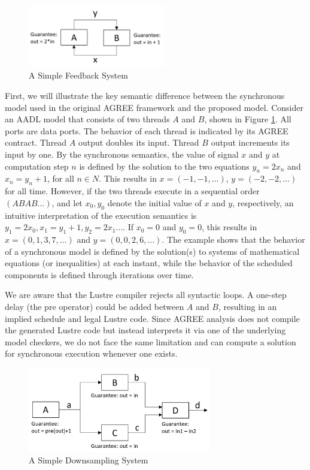 \begin{figure}[ht!]
\centering
\includegraphics[width=60mm]{simpleFeedback.jpg}
\caption{A Simple Feedback System\label{motivationFig1}}
\end{figure}

First, we will illustrate the key semantic difference between the synchronous model used in the original AGREE framework and the proposed model.
Consider an AADL model that consists of two threads $A$ and $B$, shown in Figure \ref{motivationFig1}. All ports are data ports. The behavior of each thread is indicated by its AGREE contract. Thread $A$ output doubles its input. Thread $B$ output increments its input by one. By the synchronous semantics, the value of signal $x$ and $y$ at computation step $n$ is defined by the solution to the two equations $y_n = 2x_n$ and $x_n = y_n+1$, for all $n \in N$. This results in $x = (-1, -1, …)$, $y = (-2, -2, …)$ for all time. However, if the two threads execute in a sequential order $(ABAB...)$, and let $x_0, y_0$ denote the initial value of $x$ and $y$, respectively, an intuitive interpretation of the execution semantics is $y_1 = 2x_0, x_1 = y_1+1, y_2 = 2x_1...$. If $x_0 = 0$ and  $y_0 = 0$, this results in $x = (0, 1, 3, 7,…)$ and $y = (0, 0, 2, 6, …)$. The example shows that the behavior of a synchronous model is defined by the solution(s) to systems of mathematical equations (or inequalities) at each instant, while the behavior of the scheduled components is defined through iterations over time.  

We are aware that the Lustre compiler rejects all syntactic loops.  A one-step delay (the \textsf{pre} operator) could be added between $A$ and $B$, resulting in an implied schedule and legal Lustre code. Since AGREE analysis does not compile the generated Lustre code but instead interprets it via one of the underlying model checkers, we do not face the same limitation and can compute a solution for synchronous execution whenever one exists.  

\begin{figure}[ht!]
\centering
\includegraphics[width=80mm]{downsample.jpg}
\caption{A Simple Downsampling System\label{motivationFig2}}
\end{figure}

